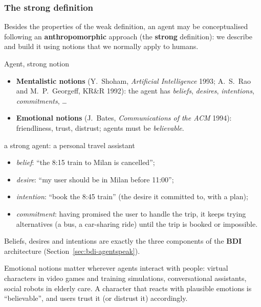 \subsubsection{The strong definition}

Besides the properties of the weak definition, an agent may be conceptualised following an
\textbf{anthropomorphic} approach (the \textbf{strong} definition): we describe and build it
using notions that we normally apply to humans.

\begin{nbdef}{Agent, strong notion}
\begin{itemize}[nosep]
  \item \textbf{Mentalistic notions} (Y.~Shoham, \emph{Artificial Intelligence} 1993; A.~S.~Rao
        and M.~P.~Georgeff, KR\&R 1992): the agent has \emph{beliefs}, \emph{desires},
        \emph{intentions}, \emph{commitments}, \ldots
  \item \textbf{Emotional notions} (J.~Bates, \emph{Communications of the ACM} 1994):
        friendliness, trust, distrust; agents must be \emph{believable}.
\end{itemize}
\end{nbdef}

\begin{nbexample}{a strong agent: a personal travel assistant}
\notinslides
\begin{itemize}[nosep]
  \item \emph{belief}: ``the 8:15 train to Milan is cancelled'';
  \item \emph{desire}: ``my user should be in Milan before 11:00'';
  \item \emph{intention}: ``book the 8:45 train'' (the desire it committed to, with a plan);
  \item \emph{commitment}: having promised the user to handle the trip, it keeps trying
        alternatives (a bus, a car-sharing ride) until the trip is booked or impossible.
\end{itemize}
Beliefs, desires and intentions are exactly the three components of the \textbf{BDI}
architecture (Section~\ref{sec:bdi-agentspeak}).
\end{nbexample}

\begin{nbwhy}
Emotional notions matter wherever agents interact with people: virtual characters in video
games and training simulations, conversational assistants, social robots in elderly care.
A character that reacts with plausible emotions is ``believable'', and users trust it
(or distrust it) accordingly.
\end{nbwhy}
